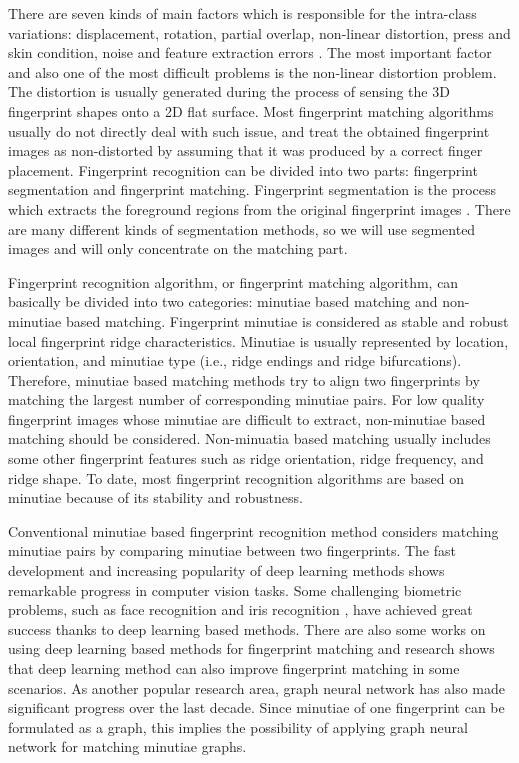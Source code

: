 There are seven kinds of main factors which is responsible for the intra-class variations: displacement, rotation, partial overlap, non-linear distortion, press and skin condition,  noise and feature extraction errors \cite{Maltoni2009}.
The most important factor and also one of the most difficult problems is the non-linear distortion problem. The distortion is usually generated during the process of sensing the 3D fingerprint shapes onto a 2D flat surface. Most fingerprint matching algorithms usually do not directly deal with such issue, and treat the obtained fingerprint images as non-distorted by assuming that it was produced by a correct finger placement. Fingerprint recognition can be divided into two parts: fingerprint segmentation and fingerprint matching. Fingerprint segmentation is the process which extracts the foreground regions from the original fingerprint images \cite{Maltoni2009}. There are many different kinds of segmentation methods, so we will use segmented images and will only concentrate on the matching part.

Fingerprint recognition algorithm, or fingerprint matching algorithm, can basically be divided into two categories: minutiae based matching and non-minutiae based matching. Fingerprint minutiae is considered as stable and robust local fingerprint ridge characteristics. Minutiae is usually represented by location, orientation, and minutiae type (i.e., ridge endings and ridge bifurcations). Therefore, minutiae based matching methods try to align two fingerprints by matching the largest number of corresponding minutiae pairs. For low quality fingerprint images whose minutiae are difficult to extract, non-minutiae based matching should be considered. Non-minuatia based matching usually includes some other fingerprint features such as ridge orientation, ridge frequency, and ridge shape. To date, most fingerprint recognition algorithms are based on minutiae because of its stability and robustness.

Conventional minutiae based fingerprint recognition method considers matching minutiae pairs by comparing minutiae between two fingerprints. The fast development and increasing popularity of deep learning methods shows remarkable progress in computer vision tasks. Some challenging biometric problems, such as face recognition \cite{SchroffCVPR2015facenet} and iris recognition \cite{ZhaoICCV2017}, have achieved great success thanks to deep learning based methods. There are also some works on using deep learning based methods for fingerprint matching and research shows that deep learning method can also improve fingerprint matching in some scenarios. As another popular research area, graph neural network has also made significant progress over the last decade. Since minutiae of one fingerprint can be formulated as a graph, this implies the possibility of applying graph neural network for matching minutiae graphs. 

